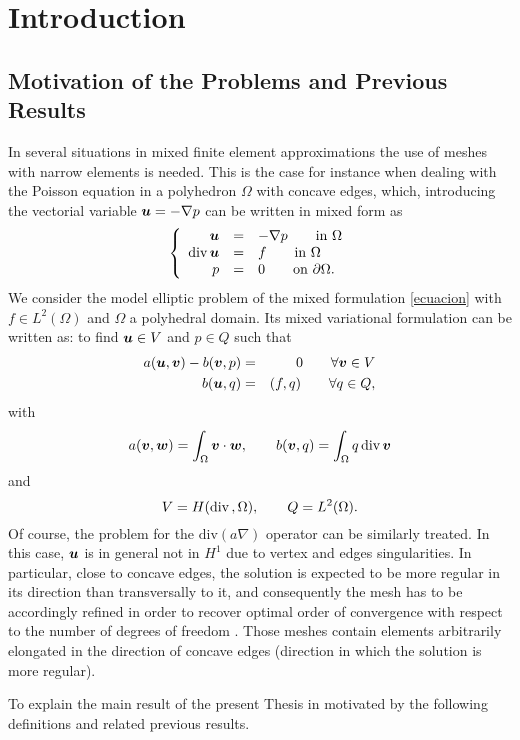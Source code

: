 \chapter*{Introduction}
 
\section*{Motivation of the Problems and Previous Results} %

In several situations in mixed finite element approximations the use of meshes 
with narrow elements is needed. This is the case for instance when dealing with
the Poisson equation 
in a polyhedron $\Omega$ with concave edges, which, introducing the 
vectorial variable $\boldsymbol{u}=-\nabla p$ can 
be written in mixed form as
\begin{equation}\label{mf} \left\{\begin{array}{rcl}
\boldsymbol{u}&=&-\nabla p\qquad \mbox{in }\Omega\\
\mbox{div\,}\boldsymbol{u}&=&f\qquad \mbox{in }\Omega\\
p&=&0\qquad\mbox{on }\partial\Omega.\end{array}\right.
\end{equation}
We consider the model elliptic problem of the mixed
formulation \eqref{ecuacion}  with 
$f\in L^2(\Omega)$ and $\Omega$ a polyhedral domain. Its mixed 
variational formulation can be written as: to find $\boldsymbol{u}\in V$ and $p\in Q$ 
such that
\begin{eqnarray}\label{P}
a(\boldsymbol{u},\boldsymbol{v}) - b(\boldsymbol{v},p) & = & 0 \qquad \forall \boldsymbol{v}\in V\\ \nonumber b(\boldsymbol{u},q) &
= & (f,q)\qquad \forall q\in Q,  
\end{eqnarray}
with
\[
a(\boldsymbol{v},\boldsymbol{w})=\int_\Omega\boldsymbol{v}\cdot\boldsymbol{w},\qquad b(\boldsymbol{v},q)=\int_\Omega
q\,\mbox{div\,}\boldsymbol{v}
\]
and
\[
V=H(\mbox{div\,},\Omega), \qquad Q=L^2(\Omega).
\]
Of course, the problem for the $\mbox{div}(a\nabla)$ operator can be similarly treated.
In this case,  $\boldsymbol{u}$ is in general not in $H^1$ due to vertex and edges 
singularities. In particular, close to concave edges, the solution is expected to be more regular in its direction than 
transversally to it, and consequently the mesh has to be accordingly refined in order to recover optimal order of convergence 
with respect to the number of degrees of freedom 
\cite{alw, apelNicaise}. Those meshes contain elements arbitrarily 
elongated in the direction of concave edges (direction in which the solution is more regular). 

To explain the main result of the present Thesis in motivated by the following
definitions and related previous results.

